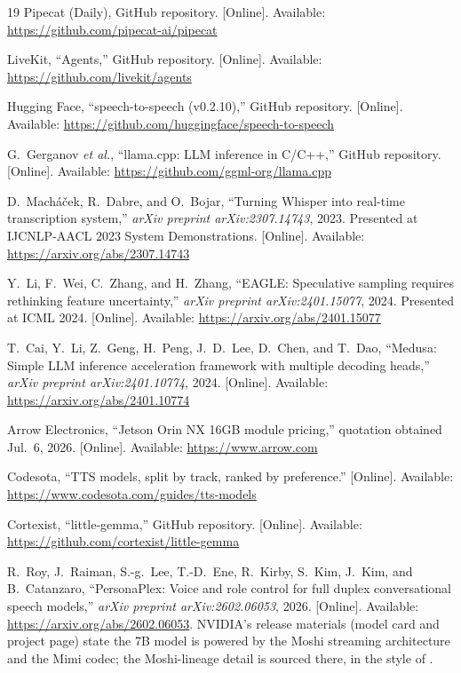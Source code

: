 \documentclass{article}
\begin{document}
\begin{thebibliography}{19}
	Pipecat (Daily), GitHub repository. [Online]. Available: \url{https://github.com/pipecat-ai/pipecat}

	LiveKit, ``Agents,'' GitHub repository. [Online]. Available: \url{https://github.com/livekit/agents}

	Hugging Face, ``speech-to-speech (v0.2.10),'' GitHub repository. [Online]. Available: \url{https://github.com/huggingface/speech-to-speech}

	G.~Gerganov \emph{et al.}, ``llama.cpp: LLM inference in C/C++,'' GitHub repository. [Online]. Available: \url{https://github.com/ggml-org/llama.cpp}

	D.~Mach\'a\v{c}ek, R.~Dabre, and O.~Bojar, ``Turning Whisper into real-time transcription system,'' \emph{arXiv preprint arXiv:2307.14743}, 2023. Presented at IJCNLP-AACL 2023 System Demonstrations. [Online]. Available: \url{https://arxiv.org/abs/2307.14743}

	Y.~Li, F.~Wei, C.~Zhang, and H.~Zhang, ``EAGLE: Speculative sampling requires rethinking feature uncertainty,'' \emph{arXiv preprint arXiv:2401.15077}, 2024. Presented at ICML 2024. [Online]. Available: \url{https://arxiv.org/abs/2401.15077}

	T.~Cai, Y.~Li, Z.~Geng, H.~Peng, J.~D.~Lee, D.~Chen, and T.~Dao, ``Medusa: Simple LLM inference acceleration framework with multiple decoding heads,'' \emph{arXiv preprint arXiv:2401.10774}, 2024. [Online]. Available: \url{https://arxiv.org/abs/2401.10774}

	Arrow Electronics, ``Jetson Orin NX 16GB module pricing,'' quotation obtained Jul.~6, 2026. [Online]. Available: \url{https://www.arrow.com}

	Codesota, ``TTS models, split by track, ranked by preference.'' [Online]. Available: \url{https://www.codesota.com/guides/tts-models}

	Cortexist, ``little-gemma,'' GitHub repository. [Online]. Available: \url{https://github.com/cortexist/little-gemma}

	R.~Roy, J.~Raiman, S.-g.~Lee, T.-D.~Ene, R.~Kirby, S.~Kim, J.~Kim, and B.~Catanzaro, ``PersonaPlex: Voice and role control for full duplex conversational speech models,'' \emph{arXiv preprint arXiv:2602.06053}, 2026. [Online]. Available: \url{https://arxiv.org/abs/2602.06053}. NVIDIA's release materials (model card and project page) state the 7B model is powered by the Moshi streaming architecture and the Mimi codec; the Moshi-lineage detail is sourced there, in the style of \citep{kyutai2024moshirepo}.

\end{thebibliography}
\end{document}
